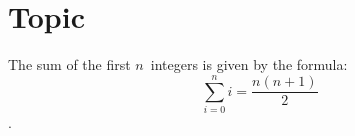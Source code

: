 \documentclass{article}
\begin{document}
\section{Topic}
The sum of the first $n$~integers is given by the formula: $$ \sum_{i = 0}^{n} i = \frac{n(n+1)}{2} $$.
\end{document}
